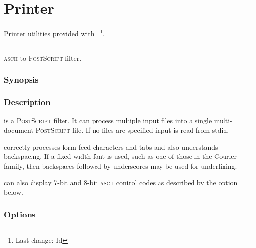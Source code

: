 \chapter{Printer}
\label{Printer}

Printer utilities provided with \aipspp\ \footnote{Last change:
$ $Id$ $}.


\section{}
\label{lwfa}

\textsc{ascii} to \textsc{PostScript} filter.

\subsection*{Synopsis}

\begin{synopsis}
\end{synopsis}

\subsection*{Description}

 is a \textsc{PostScript} filter.  It can process multiple input
files into a single multi-document \textsc{PostScript} file.  If no files are
specified input is read from stdin.

 correctly processes form feed characters and tabs and also
understands backspacing.  If a fixed-width font is used, such as one of those
in the Courier family, then backspaces followed by underscores may be used for
underlining.

 can also display 7-bit and 8-bit \textsc{ascii} control codes as
described by the  option below.

\subsection*{Options}

